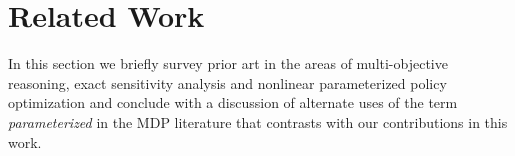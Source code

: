 \section{Related Work}
\label{sec:background}


In this section we briefly survey prior art in the areas of multi-objective reasoning, exact sensitivity analysis and nonlinear parameterized policy optimization and conclude with a discussion of alternate uses of the term \emph{parameterized} in the MDP literature that contrasts with our contributions in this work.



